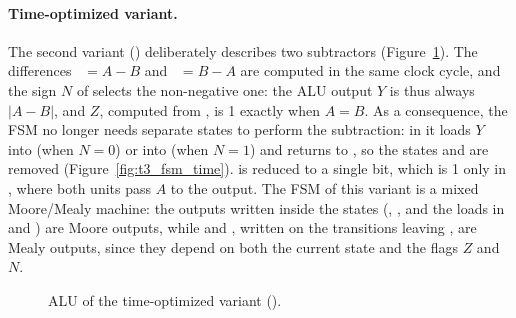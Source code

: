 \paragraph{Time-optimized variant.}
The second variant () deliberately describes two subtractors (Figure~\ref{fig:t3_alu_time}). The differences ~$=A-B$ and ~$=B-A$ are computed in the same clock cycle, and the sign $N$ of  selects the non-negative one: the ALU output $Y$ is thus always $|A-B|$, and $Z$, computed from , is 1 exactly when $A=B$. As a consequence, the FSM no longer needs separate states to perform the subtraction: in  it loads $Y$ into  (when $N=0$) or into  (when $N=1$) and returns to , so the states  and  are removed (Figure~\ref{fig:t3_fsm_time}).  is reduced to a single bit, which is 1 only in , where both units pass $A$ to the output. The FSM of this variant is a mixed Moore/Mealy machine: the outputs written inside the states (, ,  and the loads in  and ) are Moore outputs, while  and , written on the transitions leaving , are Mealy outputs, since they depend on both the current state and the flags $Z$ and $N$.


\begin{figure}[H]
    \centering
    \caption{ALU of the time-optimized variant ().}
    \label{fig:t3_alu_time}
\end{figure}


